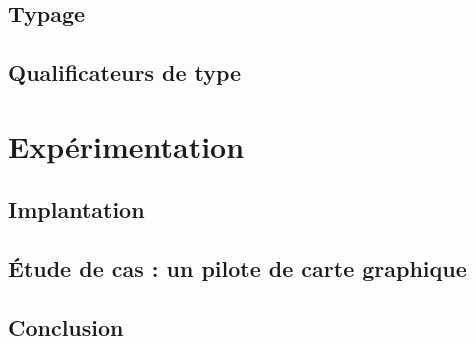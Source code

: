 \documentclass[a4paper,11pt]{memoir}
\begin{document}
\label{cha:lang}


\chapter{Typage}

\label{cha:typbase}



%

\chapter{Qualificateurs de type}

\label{cha:qualifs}



%

\part{Expérimentation}
\label{part:xp}



\chapter{Implantation}

\label{cha:implem}


\chapter{Étude de cas : un pilote de carte graphique}

\label{cha:etudedecas}


\chapter{Conclusion}

\label{cha:conclusion}

\end{document}
